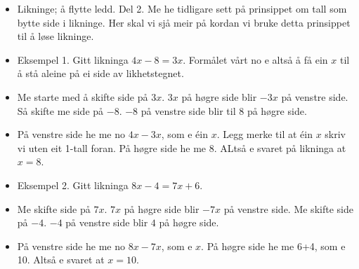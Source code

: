 


\begin{itemize}
	\item Likninge; å flytte ledd. Del 2.
	Me he tidligare sett på prinsippet om tall som bytte side i likninge. Her skal vi sjå meir på kordan vi bruke detta prinsippet til å løse likninge.
	\item Eksempel 1. Gitt likninga $ 4x-8=3x $. Formålet vårt no e altså å få ein $ x $ til å stå aleine på ei side av likhetstegnet.\\
	
	\item Me starte med å skifte side på $ 3x $. $ 3x $ på høgre side blir $ -3x $ på venstre side. Så skifte me side på $ -8 $. $ -8 $ på venstre side blir til $ 8 $ på høgre side.
	\item På venstre side he me no $ 4x-3x $, som e éin $ x $. Legg merke til at éin $ x $ skriv vi uten eit 1-tall foran. På høgre side he me $ 8 $. ALtså e svaret på likninga at $ x=8 $.
	
	\item Eksempel 2. Gitt likninga $ 8x-4=7x+6 $.
	\item Me skifte side på $ 7x $. $ 7x $ på høgre side blir $ -7x $ på venstre side. Me skifte side på $ -4 $. $ -4 $ på venstre side blir $ 4 $ på høgre side.
	\item På venstre side he me no $ 8x-7x $, som e $ x $. På høgre side he me 6+4, som e 10. Altså e svaret at $ x=10 $.

\end{itemize}

